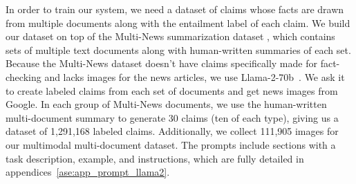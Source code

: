 In order to train our system, we need a dataset of claims whose facts are drawn from multiple documents along with the entailment label of each claim. We build our dataset on top of the Multi-News summarization dataset \cite{alex2019multinews}, which contains sets of multiple text documents along with human-written summaries of each set. Because the Multi-News dataset doesn't have claims specifically made for fact-checking and lacks images for the news articles, we use Llama-2-70b~\cite{touvron2023llama}. We ask it to create labeled claims from each set of documents and get news images from Google. In each group of Multi-News documents, we use the human-written multi-document summary to generate 30 claims (ten of each type), giving us a dataset of 1,291,168 labeled claims. Additionally, we collect 111,905 images for our multimodal multi-document dataset. The prompts include sections with a task description, example, and instructions, which are fully detailed in appendices~\ref{ase:app_prompt_llama2}.


